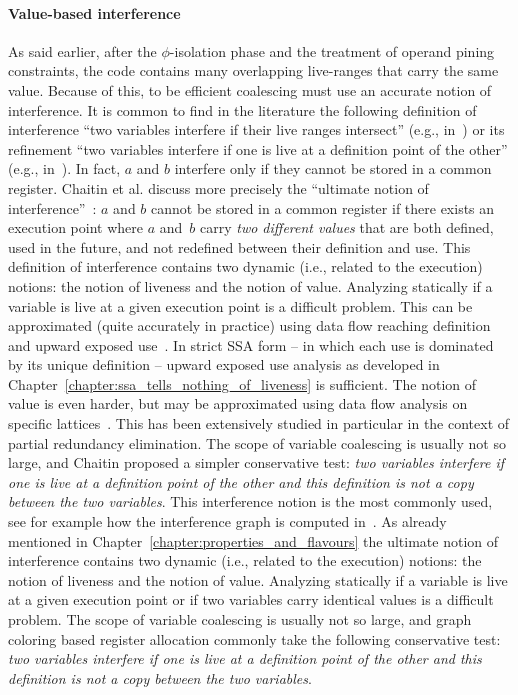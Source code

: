 \paragraph{Value-based interference}
\label{par:alternative_ssa_destruction:value}
As said earlier, after the $\phi$-isolation phase and the treatment of operand pining constraints, the code contains many overlapping live-ranges that carry the same value. Because of this, to be efficient coalescing must use an accurate notion of interference.
\ifhab
It is common to find in the literature the following definition of
  interference ``two variables interfere if their live ranges intersect''
  (e.g.,  in~\cite{George96,liverange.pldi02,SmithRH04}) or its refinement ``two variables interfere if one is live at a definition point of the other'' (e.g., in~\cite{Chaitin82}).  In fact, $a$ and $b$ interfere only if
they cannot be stored in a common register. 
Chaitin et al.  discuss more
  precisely the ``ultimate notion of interference''~\cite{Chaitin81}:
$a$ and $b$
cannot be stored in a common register if there exists an execution point where
$a$ and~$b$ carry {\em two different values} that are both defined, used in the
future, and not redefined between their definition and use.  
%
This definition of interference contains two dynamic (i.e., related to the
execution) notions: the notion of liveness and the notion of value.  
Analyzing statically if a variable is live at a given execution point is a difficult problem. 
This can be approximated (quite accurately in practice) using data
flow reaching definition and upward exposed use~\cite{appel:2002:modern}.  In
strict SSA form -- in which each use is dominated by its unique
definition -- upward exposed use analysis as developed in Chapter~\ref{chapter:ssa_tells_nothing_of_liveness} is sufficient.  The
notion of value is even harder, but may be approximated using data flow
analysis on specific lattices~\cite{AlpernWZ88, BouchezDEA}.  This has been
extensively studied in particular in the context of partial redundancy
elimination.
The scope of variable coalescing is usually not so large, and
Chaitin proposed a simpler conservative test: \emph{two variables interfere if
  one is live at a definition point of the other and this definition is not a
  copy between the two variables}. This interference notion is the most
commonly used, see for example how the interference graph is computed
in~\cite{appel:2002:modern}.
\else
As already mentioned in Chapter~\ref{chapter:properties_and_flavours} the ultimate notion of interference contains two dynamic (i.e., related to the
execution) notions: the notion of liveness and the notion of value.  
Analyzing statically if a variable is live at a given execution point or if two variables carry identical values is a difficult problem.
The scope of variable coalescing is usually not so large, and graph coloring based register allocation commonly take the following conservative test: \emph{two variables interfere if one is live at a definition point of the other and this definition is not a copy between the two variables}.
\fi

